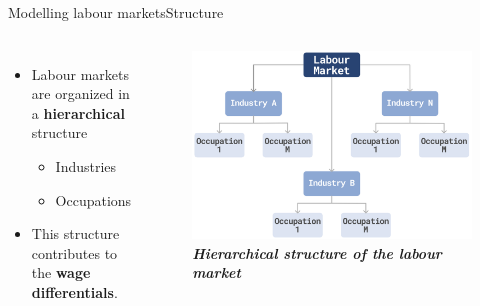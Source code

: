 \documentclass[aspectratio=169, xcolor=dvipsnames]{beamer}
\begin{document}
\begin{frame}{Modelling labour markets}{Structure}
    \vspace*{-25pt}
    \begin{columns}
            \begin{itemize}
                \setlength{\itemsep}{10pt} %
                \item \fontsize{10pt}{12pt}\selectfont Labour markets are organized in a \textbf{hierarchical} structure
                \begin{itemize}
                    \item \fontsize{10pt}{12pt}\selectfont Industries
                    \item \fontsize{10pt}{12pt}\selectfont Occupations
                \end{itemize}
                \item \fontsize{10pt}{12pt}\selectfont This structure contributes to the \textbf{wage differentials}.
            \end{itemize}
            \begin{figure}
                \centering
                \includegraphics[width=1.0\textwidth]{./images/hierarchical_structure.png}
                \captionsetup{labelformat=empty}
                \caption{\fontsize{8pt}{8pt}\selectfont \textbf{\textit{Hierarchical structure of the labour market}}}
            \end{figure}
    \end{columns}
\end{frame}
\end{document}
